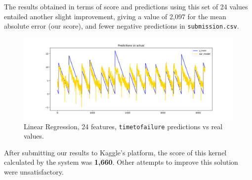 The results obtained in terms of score and predictions using this set of 24 values entailed another slight improvement, giving a value of 2,097 for the mean absolute error (our score), and fewer negative predictions in \texttt{submission.csv}.

\begin{figure} [h]
	\centering
	\includegraphics[width=1\linewidth]{pictures/linear_regression_24f.png}
	\caption{Linear Regression, 24 features, \texttt{time\textunderscore to\textunderscore failure} predictions vs real values.}
	\label{fig:LR}
\end{figure}

After submitting our results to Kaggle's platform, the score of this kernel calculated by the system was \textbf{1,660}. Other attempts to improve this solution were unsatisfactory.


